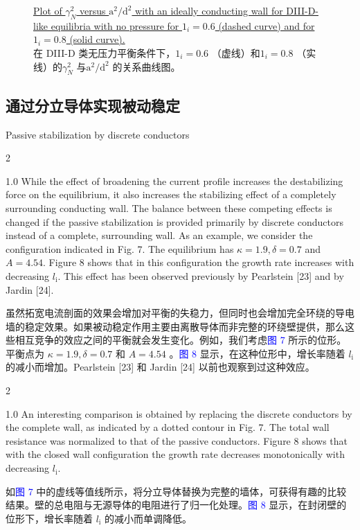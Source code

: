 \documentclass[utf8]{ctexart}
\newcommand\enzhbox[2]{
  	\quad\par \begin{paracol}{2} \colseprulecolor{black} 
  		\begin{spacing}{1.0}
  			\footnotesize  #1
  		\end{spacing}
  		\switchcolumn[1] 
  		#2
  	\end{paracol} \quad\par
  }
\begin{document}
\begin{sloppypar}
\begin{figure}[H]
 \caption{\uline{Plot of $\gamma_{N}^{2}$ versus $\mathrm{a}^{2} / \mathrm{d}^{2}$ with an ideally conducting wall for DIII-D-like equilibria with no pressure for $1_{i}=0.6$ (dashed curve) and for $1_{i}=0.8$ (solid curve).}\\在 DIII-D 类无压力平衡条件下，$1_{i}=0.6$ （虚线）和$1_{i}=0.8$ （实线）的$\gamma_{N}^{2}$ 与$\mathrm{a}^{2} / \mathrm{d}^{2}$ 的关系曲线图。}
  	\label{fig6.}
  \end{figure}
  
   
 \subsection{通过分立导体实现被动稳定}
 {  \small Passive stabilization by discrete conductors \par }
 
\enzhbox{  While the effect of broadening the current profile increases the destabilizing force on the equilibrium, it also increases the stabilizing effect of a completely surrounding conducting wall. The balance between these competing effects is changed if the passive stabilization is provided primarily by discrete conductors instead of a complete, surrounding wall. As an example, we consider the configuration indicated in Fig. 7. The equilibrium has $\kappa=1.9, \delta=0.7$ and $A=4.54$. Figure 8 shows that in this configuration the growth rate increases with decreasing $l_{\mathrm{i}}$. This effect has been observed previously by Pearlstein \textcolor{green!50!black}{[23]} and by Jardin \textcolor{green!50!black}{[24]}.}{
虽然拓宽电流剖面的效果会增加对平衡的失稳力，但同时也会增加完全环绕的导电墙的稳定效果。如果被动稳定作用主要由离散导体而非完整的环绕壁提供，那么这些相互竞争的效应之间的平衡就会发生变化。例如，我们考虑\textcolor{blue}{图 7} 所示的位形。平衡点为 $\kappa=1.9, \delta=0.7$  和 $A=4.54$ 。\textcolor{blue}{图 8} 显示，在这种位形中，增长率随着 $l_{\mathrm{i}}$ 的减小而增加。Pearlstein \textcolor{green!50!black}{[23]} 和 Jardin \textcolor{green!50!black}{[24]} 以前也观察到过这种效应。}
  
 
\enzhbox{  An interesting comparison is obtained by replacing the discrete conductors by the complete wall, as indicated by a dotted contour in Fig. 7. The total wall resistance was normalized to that of the passive conductors. Figure 8 shows that with the closed wall configuration the growth rate decreases monotonically with decreasing $l_{\mathrm{i}}$.}{
如\textcolor{blue}{图 7} 中的虚线等值线所示，将分立导体替换为完整的墙体，可获得有趣的比较结果。壁的总电阻与无源导体的电阻进行了归一化处理。\textcolor{blue}{图 8} 显示，在封闭壁的位形下，增长率随着 $l_{\mathrm{i}}$ 的减小而单调降低。}
  

\end{sloppypar}
\end{document}
